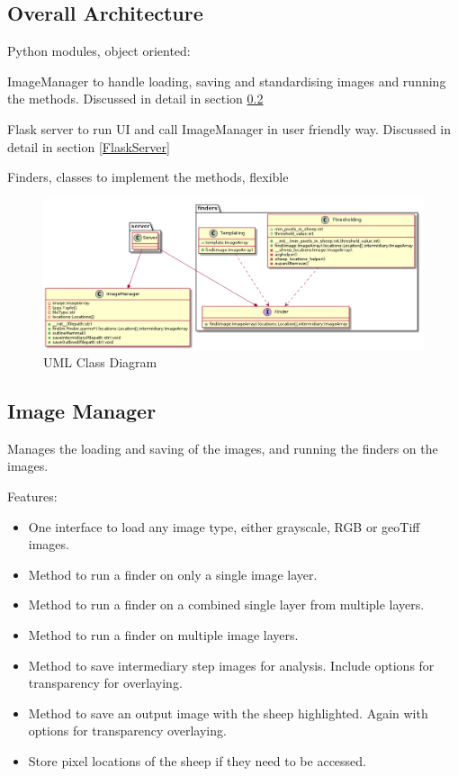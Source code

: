 \subsection{Overall Architecture}

Python modules, object oriented:

ImageManager to handle loading, saving and standardising images and running the methods. Discussed in detail in section \ref{ImageManger}

Flask server to run UI and call ImageManager in user friendly way. Discussed in detail in section \ref{FlaskServer}

Finders, classes to implement the methods, flexible

\begin{figure}
    \centering
    \includegraphics[width=\textwidth]{diagrams/uml.png}
    \caption{UML Class Diagram}
    \label{fig:uml}
\end{figure}

\subsection{Image Manager}
\label{ImageManger}

Manages the loading and saving of the images, and running the finders on the images.

Features:

\begin{itemize}
    \item One interface to load any image type, either grayscale, RGB or geoTiff images.
    \item Method to run a finder on only a single image layer.
    \item Method to run a finder on a combined single layer from multiple layers.
    \item Method to run a finder on multiple image layers.
    \item Method to save intermediary step images for analysis. Include options for transparency for overlaying.
    \item Method to save an output image with the sheep highlighted. Again with options for transparency overlaying.
    \item Store pixel locations of the sheep if they need to be accessed.
\end{itemize}


